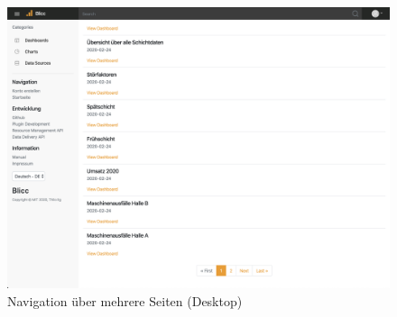 \begin{figure}[h]
    \centering
    \includegraphics[scale=0.3]{img/desktop/Pagination}
    \caption{Navigation über mehrere Seiten (Desktop)}
    \label{figure:navigationuebermehrereseiten}
\end{figure}

